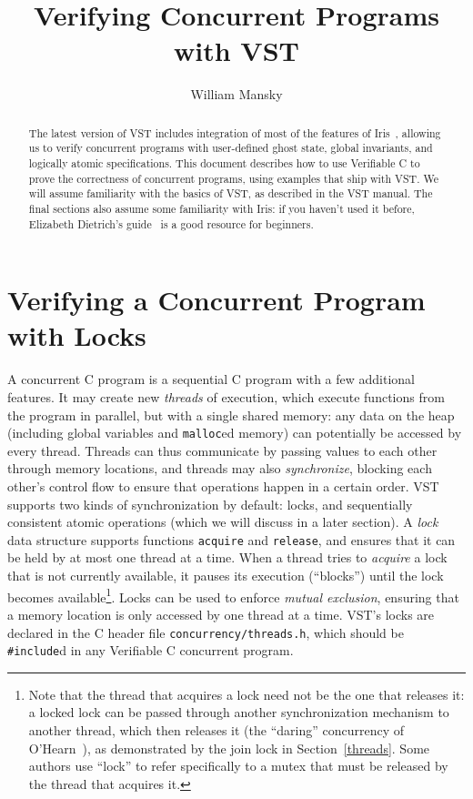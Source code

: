 \documentclass[11pt]{article}
\title{Verifying Concurrent Programs with VST}
\author{William Mansky}
\begin{document}
\maketitle

\begin{abstract}
The latest version of VST includes integration of most of the features of Iris~\cite{iris1}, allowing us to verify concurrent programs with user-defined ghost state, global invariants, and logically atomic specifications. This document describes how to use Verifiable C to prove the correctness of concurrent programs, using examples that ship with VST. We will assume familiarity with the basics of VST, as described in the VST manual. The final sections also assume some familiarity with Iris: if you haven't used it before, Elizabeth Dietrich's guide~\cite{iris-guide} is a good resource for beginners.
\end{abstract}

\section{Verifying a Concurrent Program with Locks}
A concurrent C program is a sequential C program with a few additional features. It may create new \emph{threads} of execution, which execute functions from the program in parallel, but with a single shared memory: any data on the heap (including global variables and \texttt{malloc}ed memory) can potentially be accessed by every thread. Threads can thus communicate by passing values to each other through memory locations, and threads may also \emph{synchronize}, blocking each other's control flow to ensure that operations happen in a certain order. VST supports two kinds of synchronization by default: locks, and sequentially consistent atomic operations (which we will discuss in a later section). A \emph{lock} data structure supports functions \texttt{acquire} and \texttt{release}, and ensures that it can be held by at most one thread at a time. When a thread tries to \emph{acquire} a lock that is not currently available, it pauses its execution (``blocks'') until the lock becomes available\footnote{Note that the thread that acquires a lock need not be the one that releases it: a locked lock can be passed through another synchronization mechanism to another thread, which then releases it (the ``daring'' concurrency of O'Hearn~\cite{csl}), as demonstrated by the join lock in Section~\ref{threads}. Some authors use ``lock'' to refer specifically to a mutex that must be released by the thread that acquires it.}. Locks can be used to enforce \emph{mutual exclusion}, ensuring that a memory location is only accessed by one thread at a time. VST's locks are declared in the C header file \texttt{concurrency/threads.h}, which should be \texttt{\#include}d in any Verifiable C concurrent program.
\end{document}
